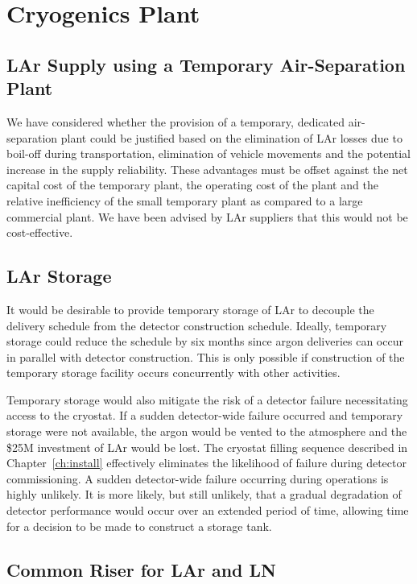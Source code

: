 \section{Cryogenics Plant}


\subsection{LAr Supply using a Temporary Air-Separation Plant}

We have considered whether the provision of a temporary, dedicated air-separation plant could be justified based on the elimination of LAr losses due to boil-off during transportation, elimination of vehicle movements and the potential increase in the supply reliability. These advantages must be offset against the net capital cost of the temporary plant, the operating cost of the plant and the relative inefficiency of the small temporary plant as compared to a large commercial plant. We have been advised by LAr suppliers that this would not be cost-effective.

\subsection{LAr Storage}

It would be desirable to provide temporary storage of LAr to decouple the delivery schedule from the detector construction schedule. Ideally, temporary storage could reduce the schedule by six months since argon deliveries can occur in parallel with detector construction. This is only possible if construction of the temporary storage facility occurs concurrently with other activities.

Temporary storage would also mitigate the risk of a detector failure necessitating access to the cryostat. If a sudden detector-wide failure occurred and temporary storage were not available, the argon would be vented to the atmosphere and the \$25M investment of LAr would be lost. The cryostat filling sequence described in Chapter~\ref{ch:install} %
effectively eliminates the likelihood of failure during detector commissioning. A sudden detector-wide failure occurring during operations is highly unlikely. It is more likely, but still unlikely, that a gradual degradation of detector performance would occur over an extended period of time, allowing time for a decision to be made to construct a storage tank.



\subsection{Common Riser for LAr and LN}

